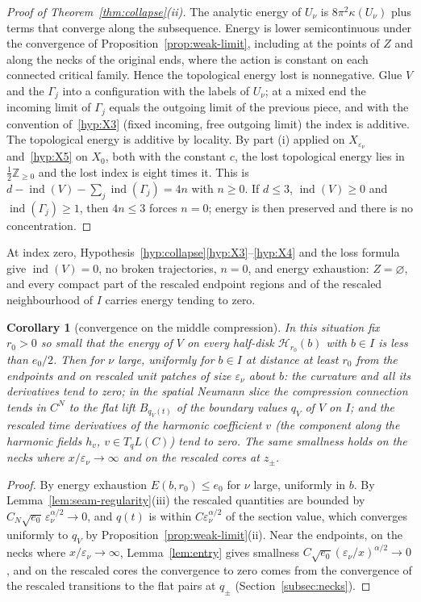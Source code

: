 \documentclass[11pt]{amsart}
\newtheorem{corollary}[theorem]{Corollary}
\theoremstyle{definition}
\theoremstyle{remark}
\theoremstyle{plain}
\numberwithin{equation}{section}
\newcommand{\ZZ}{\mathbb{Z}}
\newcommand{\ind}{\operatorname{ind}}
\newcommand{\eps}{\varepsilon}
\begin{document}
\begin{proof}[Proof of Theorem~\ref{thm:collapse}(ii)]
The analytic energy of $U_\nu$ is $8\pi^2\kappa(U_\nu)$ plus terms that
converge along the subsequence. Energy is lower semicontinuous under the
convergence of Proposition~\ref{prop:weak-limit}, including at the points
of $Z$ and along the necks of the original ends, where the action is
constant on each connected critical family. Hence the topological energy
lost is nonnegative. Glue $V$ and the $\Gamma_j$ into a configuration
with the labels of $U_\nu$; at a mixed end the incoming limit of $\Gamma_j$ equals
the outgoing limit of the previous piece, and with the convention
of~\ref{hyp:X3} (fixed incoming, free outgoing limit) the index is additive.
The topological energy is additive by locality. By part (i) applied on
$X_{\eps_\nu}$ and~\ref{hyp:X5} on $X_0$, both with the constant $c$, the lost
topological energy lies in $\tfrac12\ZZ_{\ge0}$ and the lost index is eight
times it. This is $d-\ind(V)-\sum_j\ind(\Gamma_j)=4n$ with $n\ge0$. If $d\le3$,
$\ind(V)\ge0$ and $\ind(\Gamma_j)\ge1$, then $4n\le3$ forces $n=0$; energy is
then preserved and there is no concentration.
\end{proof}

At index zero, Hypothesis~\ref{hyp:collapse}\ref{hyp:X3}--\ref{hyp:X4}
and the loss formula give $\ind(V)=0$, no broken trajectories, $n=0$, and
energy exhaustion: $Z=\varnothing$, and every compact part of the rescaled
endpoint regions and of the rescaled neighbourhood of $I$ carries energy
tending to zero.

\begin{corollary}[convergence on the middle compression]\label{cor:seam-convergence}
In this situation fix $r_0>0$ so small that the energy of $V$ on every half-disk
$\mathcal H_{r_0}(b)$ with $b\in I$ is less than $e_0/2$. Then for $\nu$ large,
uniformly for $b\in I$ at distance at least $r_0$ from the endpoints and on
rescaled unit patches of size $\eps_\nu$ about $b$: the curvature and all its
derivatives tend to zero; in the spatial Neumann slice the compression
connection tends in $C^N$ to the flat lift $B_{q_V(t)}$ of the boundary values
$q_V$ of $V$ on $I$; and the rescaled time derivatives of the harmonic coefficient $v$
(the component along the harmonic fields $h_v$, $v\in T_qL(C)$) tend to zero.
The same smallness holds on the necks where $x/\eps_\nu\to\infty$ and on the
rescaled cores at $z_\pm$.
\end{corollary}

\begin{proof}
By energy exhaustion $E(b,r_0)\le e_0$ for $\nu$ large, uniformly in $b$. By
Lemma~\ref{lem:seam-regularity}(iii) the rescaled quantities are bounded by
$C_N\sqrt{e_0}\,\eps_\nu^{\alpha/2}\to0$, and $q(t)$ is within
$C\eps_\nu^{\alpha/2}$ of the section value, which converges uniformly to $q_V$
by Proposition~\ref{prop:weak-limit}(ii). Near the endpoints, on the
necks where $x/\eps_\nu\to\infty$, Lemma~\ref{lem:entry} gives smallness
$C\sqrt{e_0}(\eps_\nu/x)^{\alpha/2}\to0$, and on the rescaled cores the convergence to
zero comes from the convergence of the rescaled transitions to the flat pairs at
$q_\pm$ (Section~\ref{subsec:necks}).
\end{proof}
\end{document}
